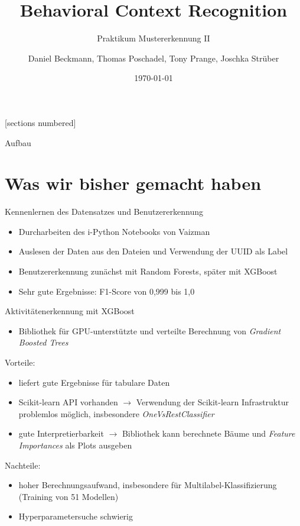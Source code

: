 \documentclass[10pt,%
	wide,%
	xcolor={x11names},%
	hyperref={colorlinks},%
	pantone312,%
	handout,%
	]{beamer}
\author{Daniel Beckmann, Thomas Poschadel, Tony Prange, Joschka Strüber}
\title{Behavioral Context Recognition}
\subtitle{Praktikum Mustererkennung II}
\date{\today}
\begin{document}
[sections numbered]

\begin{frame}[plain]
  \maketitle
\end{frame}

\begin{frame}[t]{Aufbau}
\end{frame}

\section{Was wir bisher gemacht haben}

\begin{frame}[t]{Kennenlernen des Datensatzes und Benutzererkennung}
	\begin{itemize}
		\item Durcharbeiten des i-Python Notebooks von Vaizman
		\item Auslesen der Daten aus den Dateien und Verwendung der UUID als Label
		\item Benutzererkennung zunächst mit Random Forests, später mit XGBoost
		\item Sehr gute Ergebnisse: F1-Score von 0,999 bis 1,0 
	\end{itemize}
\end{frame}

\begin{frame}[t]{Aktivitätenerkennung mit XGBoost}
	\begin{itemize}
		\item Bibliothek für GPU-unterstützte und verteilte Berechnung von \emph{Gradient Boosted Trees}
	\end{itemize}
	Vorteile:
	\begin{itemize}
		\item liefert gute Ergebnisse für tabulare Daten
		\item Scikit-learn API vorhanden $\rightarrow$ Verwendung der Scikit-learn Infrastruktur problemlos möglich, insbesondere \emph{OneVsRestClassifier}
		\item gute Interpretierbarkeit $\rightarrow$ Bibliothek kann berechnete Bäume und \emph{Feature Importances} als Plots ausgeben
	\end{itemize}
	Nachteile:
	\begin{itemize}
		\item hoher Berechnungsaufwand, insbesondere für Multilabel-Klassifizierung (Training von 51 Modellen)
		\item Hyperparametersuche schwierig
	\end{itemize}
\end{frame}
\end{document}
